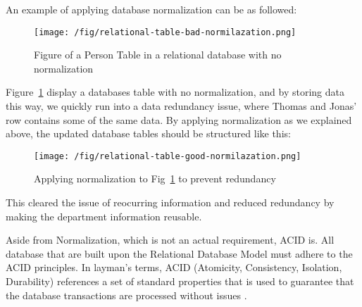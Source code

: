 An example of applying database normalization can be as followed:
\begin{figure}[h]
    \centering
    \texttt{[image: /fig/relational-table-bad-normilazation.png]}
    \caption{Figure of a Person Table in a relational database with no normalization}
    \label{fig:relational-database-table-normalization-bad}
\end{figure}

Figure~\ref{fig:relational-database-table-normalization-bad} display a databases table with no normalization, and by storing data this way, we quickly run into a data redundancy issue, where Thomas and Jonas' row contains some of the same data.
By applying normalization as we explained above, the updated database tables should be structured like this:
\begin{figure}[h]
    \centering
    \texttt{[image: /fig/relational-table-good-normilazation.png]}
    \caption{Applying normalization to Fig~\ref{fig:relational-database-table-normalization-bad} to prevent redundancy}
    \label{fig:relational-database-table-normalization-good}
\end{figure}

This cleared the issue of reocurring information and reduced redundancy by making the department information reusable.

Aside from Normalization, which is not an actual requirement, ACID is.
All database that are built upon the Relational Database Model must adhere to the ACID principles. In layman's terms, ACID (Atomicity, Consistency, Isolation, Durability) references a set of standard properties that is used to guarantee that the database transactions are processed without issues \parencite{databaseguide-acid}.\\

